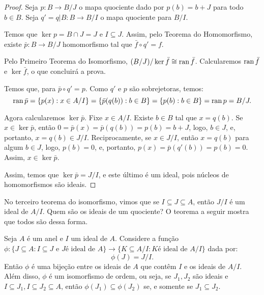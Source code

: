 \begin{proof}
    Seja $p:B\rightarrow B/J$ o mapa quociente dado por $p(b)=b+J$ para todo $b \in B$.
    Seja $q'=q|B:B\rightarrow B/I$ o mapa quociente para $B/I$.

    Temos que $\ker p=B\cap J=J$ e $I\subseteq J$.
    Assim, pelo Teorema do Homomorfismo, existe $\bar p:B\rightarrow B/J$ homomorfismo tal que $\bar f\circ q'=f$.
    \begin{figure}[H]\centering
    \end{figure}
    Pelo Primeiro Teorema do Isomorfismo, $(B/J)/\ker \bar f\cong \operatorname{ran} \bar f$.
    Calcularemos $\operatorname{ran} \bar f$ e $\ker \bar f$, o que concluirá a prova.

    Temos que, para $\bar p\circ q'=p$.
    Como $q'$ e $p$ são sobrejetoras, temos:
    \[\operatorname{ran} \bar p=\{p(x): x \in A/I\}=\{\bar p(q(b)):b \in B\}=\{p(b):b \in B\}=\operatorname{ran} p=B/J.\]

    Agora calcularemos $\ker \bar p$.
    Fixe $x \in A/I$.
    Existe $b \in B$ tal que $x=q(b)$.
    Se $x \in \ker \bar p$, então $0=\bar p(x)=\bar p(q(b))=p(b)=b+J$, logo, $b \in J$, e, portanto, $x=q(b)\in J/I$.
    Reciprocamente, se $x \in J/I$, então $x=q(b)$ para algum $b \in J$, logo, $p(b)=0$, e, portanto, $p(x)=\bar p(q'(b))=p(b)=0$.
    Assim, $x \in \ker \bar p$.

    Assim, temos que $\ker \bar p=J/I$, e este último é um ideal, pois núcleos de homomorfismos são ideais.
\end{proof}

No terceiro teorema do isomorfismo, vimos que se $I\subseteq J\subseteq A$, então $J/I$ é um ideal de $A/I$.
Quem são os ideais de um quociente?
O teorema a seguir mostra que todos são dessa forma.

\begin{theorem}
    Seja $A$ é um anel e $I$ um ideal de $A$.
    Considere a função $\phi:\{J\subseteq A: I\subseteq J \text{ e } J \text{é ideal de } A\}\rightarrow \{K\subseteq A/I: K \text{é ideal de } A/I\}$ dada por:
    \[\phi(J)=J/I.\]
    Então $\phi$ é uma bijeção entre os ideais de $A$ que contêm $I$ e os ideais de $A/I$.
    Além disso, $\phi$ é um isomorfismo de ordem, ou seja, se $J_1, J_2$ são ideais e $I\subseteq J_1, I\subseteq J_2\subseteq A$, então $\phi(J_1)\subseteq \phi(J_2)$ se, e somente se $J_1\subseteq J_2$.
\end{theorem}

